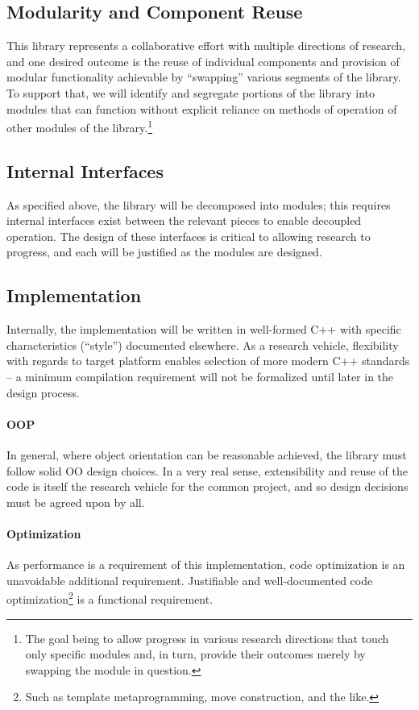 \documentclass{article}
\begin{document}
\subsection{Modularity and Component Reuse}

This library represents a collaborative effort with multiple directions of research, and one desired outcome is the reuse of individual components and provision of modular functionality achievable by ``swapping'' various segments of the library.  To support that, we will identify and segregate portions of the library into modules that can function without explicit reliance on methods of operation of other modules of the library.\footnote{The goal being to allow progress in various research directions that touch only specific modules and, in turn, provide their outcomes merely by swapping the module in question.}

\subsection{Internal Interfaces}

As specified above, the library will be decomposed into modules; this requires internal interfaces exist between the relevant pieces to enable decoupled operation.  The design of these interfaces is critical to allowing research to progress, and each will be justified as the modules are designed.

\subsection{Implementation}

Internally, the implementation will be written in well-formed C++ with specific characteristics (``style'') documented elsewhere.  As a research vehicle, flexibility with regards to target platform enables selection of more modern C++ standards -- a minimum compilation requirement will not be formalized until later in the design process.

\paragraph{OOP}  In general, where object orientation can be reasonable achieved, the library must follow solid OO design choices.  In a very real sense, extensibility and reuse of the code is itself the research vehicle for the common project, and so design decisions must be agreed upon by all.

\paragraph{Optimization}  As performance is a requirement of this implementation, code optimization is an unavoidable additional requirement.  Justifiable and well-documented code optimization\footnote{Such as template metaprogramming, move construction, and the like.} is a functional requirement.
\end{document}
